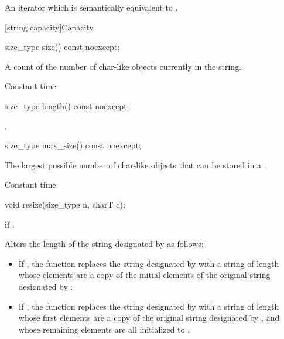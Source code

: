 \begin{itemdescr}
\pnum
\returns
An iterator which is semantically equivalent to
.
\end{itemdescr}

[string.capacity]{Capacity}

%
\begin{itemdecl}
size_type size() const noexcept;
\end{itemdecl}

\begin{itemdescr}
\pnum
\returns
A count of the number of char-like objects currently in the string.

\pnum
\complexity Constant time.
\end{itemdescr}

%
\begin{itemdecl}
size_type length() const noexcept;
\end{itemdecl}

\begin{itemdescr}
\pnum
\returns
{}.
\end{itemdescr}

%
\begin{itemdecl}
size_type max_size() const noexcept;
\end{itemdecl}

\begin{itemdescr}
\pnum
\returns
The largest possible number of char-like objects that can be stored in a
.

\pnum
\complexity Constant time.
\end{itemdescr}

%
\begin{itemdecl}
void resize(size_type n, charT c);
\end{itemdecl}

\begin{itemdescr}
\pnum
\throws
{}
if
.

\pnum
\effects
Alters the length of the string designated by
as follows:

\begin{itemize}
\item
If
,
the function replaces the string designated by
with a string of length  whose elements are a
copy of the initial elements of the original string designated by
.
\item
If
,
the function replaces the string designated by
with a string of length  whose first
elements are a copy of the original string designated by
,
and whose remaining elements are all initialized to .
\end{itemize}
\end{itemdescr}

